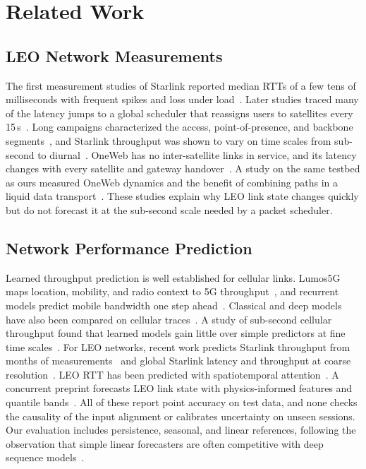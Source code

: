 \section{Related Work}
\label{sec:related}
\subsection{LEO Network Measurements}
The first measurement studies of Starlink reported median RTTs of a few tens of milliseconds with frequent spikes and loss under load~\cite{michel2022first}. Later studies traced many of the latency jumps to a global scheduler that reassigns users to satellites every 15\,s~\cite{mohan2024multifaceted,tanveer2023making}. Long campaigns characterized the access, point-of-presence, and backbone segments~\cite{pan2023measuring}, and Starlink throughput was shown to vary on time scales from sub-second to diurnal~\cite{garcia2023multitimescale}. OneWeb has no inter-satellite links in service, and its latency changes with every satellite and gateway handover~\cite{zhao2025measuring}. A study on the same testbed as ours measured OneWeb dynamics and the benefit of combining paths in a liquid data transport~\cite{perrin2025measurement}. These studies explain why LEO link state changes quickly but do not forecast it at the sub-second scale needed by a packet scheduler.

\subsection{Network Performance Prediction}
Learned throughput prediction is well established for cellular links. Lumos5G maps location, mobility, and radio context to 5G throughput~\cite{narayanan2020lumos5g}, and recurrent models predict mobile bandwidth one step ahead~\cite{mei2019realtime}. Classical and deep models have also been compared on cellular traces~\cite{raca2020leveraging}. A study of sub-second cellular throughput found that learned models gain little over simple predictors at fine time scales~\cite{basit2024predictability}. For LEO networks, recent work predicts Starlink throughput from months of measurements~\cite{liu2025vivisecting} and global Starlink latency and throughput at coarse resolution~\cite{benghe2026horizon}. LEO RTT has been predicted with spatiotemporal attention~\cite{tian2025attention}. A concurrent preprint forecasts LEO link state with physics-informed features and quantile bands~\cite{chi2026reading}. All of these report point accuracy on test data, and none checks the causality of the input alignment or calibrates uncertainty on unseen sessions. Our evaluation includes persistence, seasonal, and linear references, following the observation that simple linear forecasters are often competitive with deep sequence models~\cite{zeng2023transformers}.

